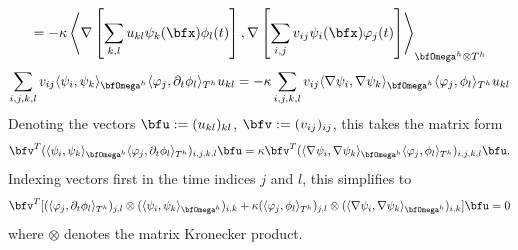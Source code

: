 \begin{example}
\begin{multline}
            =  - \kappa\left\langle\nabla\left[\sum_{k, l}u_{kl}\psi_{k}(\bfx)\phi_{l}(t)\right], \nabla\left[\sum_{i, j}v_{ij}\psi_{i}(\bfx)\varphi_{j}(t)\right]\right\rangle_{\bfOmega^{h}\otimes T^{h}}
        \end{multline}
        \begin{equation}
            \sum_{i, j, k, l}v_{ij}\langle\psi_{i}, \psi_{k}\rangle_{\bfOmega^{h}}\langle\varphi_{j}, \partial_{t}\phi_{l}\rangle_{T^{h}}u_{kl}  =  - \kappa\sum_{i, j, k, l}v_{ij}\langle\nabla\psi_{i}, \nabla\psi_{k}\rangle_{\bfOmega^{h}}\langle\varphi_{j}, \phi_{l}\rangle_{T^{h}}u_{kl}
        \end{equation}
        Denoting the vectors $\bfu  :=  (u_{kl})_{kl}$, $\bfv  :=  (v_{ij})_{ij}$, this takes the matrix form
        \begin{equation}
            \bfv^{T}(\langle\psi_{i}, \psi_{k}\rangle_{\bfOmega^{h}}\langle\varphi_{j}, \partial_{t}\phi_{l}\rangle_{T^{h}})_{i, j, k, l}\bfu  =  \kappa\bfv^{T}(\langle\nabla\psi_{i}, \nabla\psi_{k}\rangle_{\bfOmega^{h}}\langle\varphi_{j}, \phi_{l}\rangle_{T^{h}})_{i, j, k, l}\bfu.
        \end{equation}
        Indexing vectors first in the time indices $j$ and $l$, this simplifies to
        \begin{equation}
            \bfv^{T}[(\langle\varphi_{j}, \partial_{t}\phi_{l}\rangle_{T^{h}})_{j, l}\otimes(\langle\psi_{i}, \psi_{k}\rangle_{\bfOmega^{h}})_{i, k} + \kappa(\langle\varphi_{j}, \phi_{l}\rangle_{T^{h}})_{j, l}\otimes(\langle\nabla\psi_{i}, \nabla\psi_{k}\rangle_{\bfOmega^{h}})_{i, k}]\bfu  =  0
        \end{equation}
        where $\otimes$ denotes the matrix Kronecker product.
        

\end{example}
